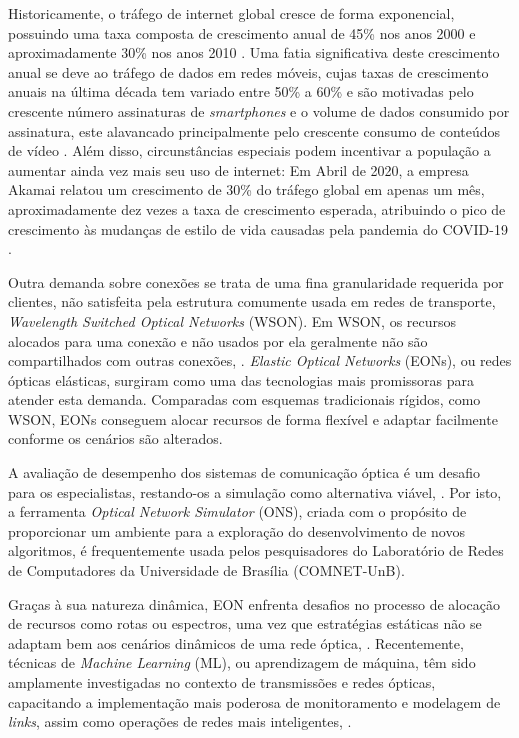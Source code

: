 

Historicamente, o tráfego de internet global cresce de forma exponencial, possuindo uma taxa composta de crescimento anual de 45\% nos anos 2000 \cite{network_evolution_2020} e aproximadamente 30\% nos anos 2010 \cite{cisco2011cisco, cisco2012cisco, cisco2013cisco, cisco2014cisco, cisco2015cisco, cisco2016cisco, cisco2017cisco, cisco2018cisco}. Uma fatia significativa deste crescimento anual se deve ao tráfego de dados em redes móveis, cujas taxas de crescimento anuais na última década tem variado entre 50\% a 60\% e são motivadas pelo crescente número assinaturas de \textit{smartphones} e o volume de dados consumido por assinatura, este alavancado principalmente pelo crescente consumo de conteúdos de vídeo \cite{ericsson_mobility_report_2020}. Além disso, circunstâncias especiais podem incentivar a população a aumentar ainda vez mais seu uso de internet: Em Abril de 2020, a empresa Akamai relatou um crescimento de 30\% do tráfego global em apenas um mês, aproximadamente dez vezes a taxa de crescimento esperada, atribuindo o pico de crescimento às mudanças de estilo de vida causadas pela pandemia do COVID-19 \cite{mckeay_2020}.

Outra demanda sobre conexões se trata de uma fina granularidade requerida por clientes, não satisfeita pela estrutura comumente usada em redes de transporte, \textit{Wavelength Switched Optical Networks} (WSON). Em WSON, os recursos alocados para uma conexão e não usados por ela geralmente não são compartilhados com outras conexões, \cite{dantaschallenges2014}. \textit{Elastic Optical Networks} (EONs), ou redes ópticas elásticas, surgiram como uma das tecnologias mais promissoras para atender esta demanda. Comparadas com esquemas tradicionais rígidos, como WSON, EONs conseguem alocar recursos de forma flexível e adaptar facilmente conforme os cenários são alterados. \cite{deeplearning4j}

A avaliação de desempenho dos sistemas de comunicação óptica é um desafio para os especialistas, restando-os a simulação como alternativa viável, \cite{costa2016ons}. Por isto, a ferramenta \textit{Optical Network Simulator} (ONS), criada com o propósito de proporcionar um ambiente para a exploração do desenvolvimento de novos algoritmos, é frequentemente usada pelos pesquisadores do Laboratório de Redes de Computadores da Universidade de Brasília (COMNET-UnB).

Graças à sua natureza dinâmica, EON enfrenta desafios no processo de alocação de recursos como rotas ou espectros, uma vez que estratégias estáticas não se adaptam bem aos cenários dinâmicos de uma rede óptica,  \cite{deep_quality_rsa}. Recentemente, técnicas de \textit{Machine Learning} (ML), ou aprendizagem de máquina, têm sido amplamente investigadas no contexto de transmissões e redes ópticas, capacitando a implementação mais poderosa de monitoramento e modelagem de \textit{links}, assim como operações de redes mais inteligentes, \cite{eon_ml_application}.

